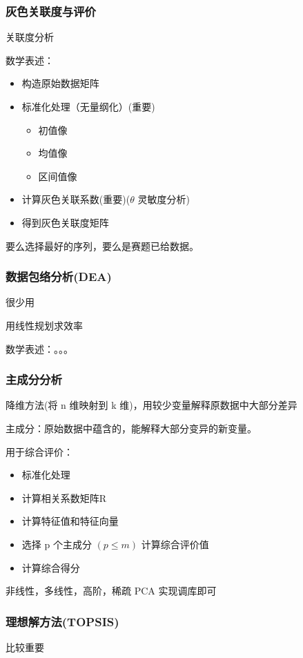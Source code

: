 \documentclass[12pt,a4paper]{article}
\begin{document}
\subsubsection{灰色关联度与评价}
关联度分析

数学表述：
\begin{itemize}
  \item 构造原始数据矩阵
  \item 标准化处理（无量纲化）(重要)
  \begin{itemize}
    \item 初值像
    \item 均值像
    \item 区间值像
  \end{itemize}
  \item 计算灰色关联系数(重要)($\theta$ 灵敏度分析)
  \item 得到灰色关联度矩阵
\end{itemize}

要么选择最好的序列，要么是赛题已给数据。
\subsubsection{数据包络分析(DEA)}
很少用

用线性规划求效率

数学表述：。。。

\subsubsection{主成分分析}
降维方法(将 n 维映射到 k 维)，用较少变量解释原数据中大部分差异

主成分：原始数据中蕴含的，能解释大部分变异的新变量。

用于综合评价：
\begin{itemize}
  \item 标准化处理
  \item 计算相关系数矩阵R
  \item 计算特征值和特征向量
  \item 选择 p 个主成分 $(p\le m)$ 计算综合评价值
  \item 计算综合得分
\end{itemize}

非线性，多线性，高阶，稀疏 PCA
实现调库即可

\subsubsection{理想解方法(TOPSIS)}
比较重要
\end{document}
